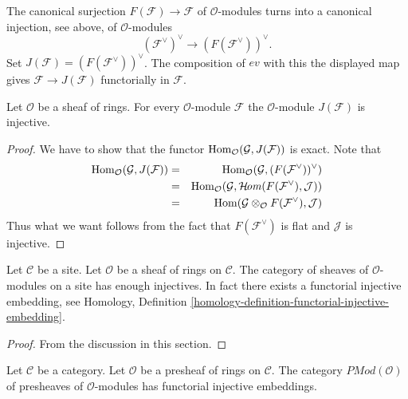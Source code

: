 \noindent
The canonical surjection
$F(\mathcal{F}) \to \mathcal{F}$ of $\mathcal{O}$-modules turns into a
canonical injection, see above, of $\mathcal{O}$-modules
$$
(\mathcal{F}^\vee)^\vee \longrightarrow (F(\mathcal{F}^\vee))^\vee.
$$
Set $J(\mathcal{F}) = (F(\mathcal{F}^\vee))^\vee$.
The composition of $ev$ with this
the displayed map gives
$\mathcal{F} \to J(\mathcal{F})$ functorially in $\mathcal{F}$.

\begin{lemma}
\label{lemma-JM-injective-sheaves}
Let $\mathcal{O}$ be a sheaf of rings.
For every $\mathcal{O}$-module $\mathcal{F}$ the
$\mathcal{O}$-module $J(\mathcal{F})$ is injective.
\end{lemma}

\begin{proof}
We have to show that the functor
$\mathop{\mathrm{Hom}}\nolimits_\mathcal{O}(\mathcal{G}, J(\mathcal{F}))$
is exact. Note that
\begin{eqnarray*}
\mathop{\mathrm{Hom}}\nolimits_\mathcal{O}(\mathcal{G}, J(\mathcal{F}))
& = &
\mathop{\mathrm{Hom}}\nolimits_\mathcal{O}(\mathcal{G}, (F(\mathcal{F}^\vee))^\vee) \\
& = &
\mathop{\mathrm{Hom}}\nolimits_\mathcal{O}
(\mathcal{G}, \mathop{\mathcal{H}\!\mathit{om}}\nolimits(F(\mathcal{F}^\vee), \mathcal{J})) \\
& = &
\mathop{\mathrm{Hom}}\nolimits(\mathcal{G} \otimes_\mathcal{O} F(\mathcal{F}^\vee), \mathcal{J})
\end{eqnarray*}
Thus what we want follows from the fact that $F(\mathcal{F}^\vee)$
is flat and $\mathcal{J}$ is injective.
\end{proof}

\begin{theorem}
\label{theorem-sheaves-modules-injectives}
Let $\mathcal{C}$ be a site.
Let $\mathcal{O}$ be a sheaf of rings on $\mathcal{C}$.
The category of sheaves of $\mathcal{O}$-modules on a
site has enough injectives. In fact there exists
a functorial injective embedding, see
Homology, Definition \ref{homology-definition-functorial-injective-embedding}.
\end{theorem}

\begin{proof}
From the discussion in this section.
\end{proof}

\begin{proposition}
\label{proposition-presheaves-modules}
Let $\mathcal{C}$ be a category.
Let $\mathcal{O}$ be a presheaf of rings on $\mathcal{C}$.
The category $\textit{PMod}(\mathcal{O})$ of presheaves of
$\mathcal{O}$-modules has functorial injective embeddings.
\end{proposition}

